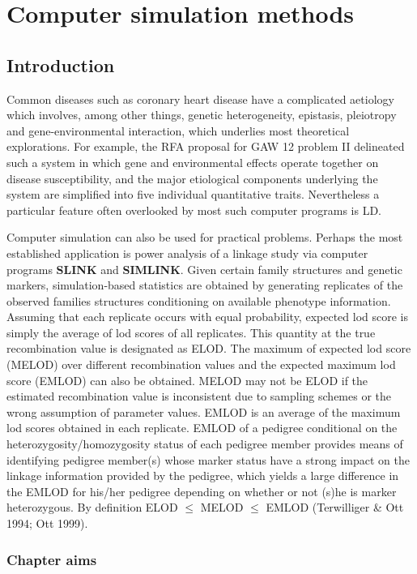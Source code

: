 \chapter{Computer simulation methods}

\section{Introduction}

Common diseases such as coronary heart disease have a complicated aetiology
which involves, among other things, genetic heterogeneity, epistasis,
pleiotropy and gene-environmental interaction, which underlies most theoretical
explorations.  For example, the RFA proposal for GAW 12 problem II delineated
such a system in which gene and environmental effects operate together on
disease susceptibility, and the major etiological components underlying the
system are simplified into five individual quantitative traits.  Nevertheless a
particular feature often overlooked by most such computer programs is LD.

Computer simulation can also be used for practical problems.  Perhaps the most
established application is power analysis of a linkage study via computer
programs {\bf SLINK} and {\bf SIMLINK}.  Given certain family structures and
genetic markers, simulation-based statistics are obtained by generating
replicates of the observed families structures conditioning on available
phenotype information.  Assuming that each replicate occurs with equal
probability, expected lod score is simply the average of lod scores of all
replicates.  This quantity at the true recombination value is designated as
ELOD.  The maximum of expected lod score (MELOD) over different recombination
values and the expected maximum lod score (EMLOD) can also be obtained.  MELOD
may not be ELOD if the estimated recombination value is inconsistent due to
sampling schemes or the wrong assumption of parameter values.  EMLOD is an
average of the maximum lod scores obtained in each replicate.  EMLOD of a
pedigree conditional on the heterozygosity/homozygosity status of each pedigree
member provides means of identifying pedigree member(s) whose marker status
have a strong impact on the linkage information provided by the pedigree, which
yields a large difference in the EMLOD for his/her pedigree depending on
whether or not (s)he is marker heterozygous.  By definition ELOD $\le$ MELOD
$\le$ EMLOD (Terwilliger \& Ott 1994; Ott 1999).


\subsection*{Chapter aims}

